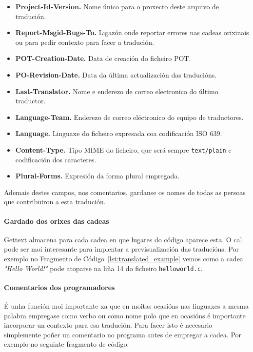\begin{itemize}
    \item \textbf{Project-Id-Version.} Nome único para o proxecto deste arquivo de tradución.
    \item \textbf{Report-Msgid-Bugs-To.} Ligazón onde reportar errores nas cadeas orixinais ou para pedir contexto para facer a tradución.
    \item \textbf{POT-Creation-Date.} Data de creación do ficheiro POT.
    \item \textbf{PO-Revision-Date.} Data da última actualización das traducións.
    \item \textbf{Last-Translator.} Nome e enderezo de correo electronico do último traductor.
    \item \textbf{Language-Team.} Enderezo de correo eléctronico do equipo de traductores.
    \item \textbf{Language.} Linguaxe do ficheiro expresada coa codificación ISO 639.
    \item \textbf{Content-Type.} Tipo MIME do ficheiro, que será sempre \lstinline{text/plain} e codificación dos caracteres.
    \item \textbf{Plural-Forms.} Expresión da forma plural empregada.
\end{itemize}

Ademais destes campos, nos comentarios, gardanse os nomes de todas as persoas que contribuiron a esta tradución.

\paragraph{Gardado dos orixes das cadeas}
Gettext almacena para cada cadea en que lugares do código aparece esta. O cal pode ser moi interesante para implentar a previsualización das traducións. Por exemplo no Fragmento de Código~\ref{lst:translated_example} vemos como a cadea \emph{"Hello World!"} pode atoparse na liña 14 do ficheiro \lstinline{helloworld.c}.

\paragraph{Comentarios dos programadores}
É unha función moi importante xa que en moitas ocasións nas linguaxes a mesma palabra empregase como verbo ou como nome polo que en ocasións é importante incorporar un contexto para esa tradución. Para facer isto é necesario simplemente poñer un comentario no programa antes de empregar a cadea. Por exemplo no seguinte fragmento de código:

